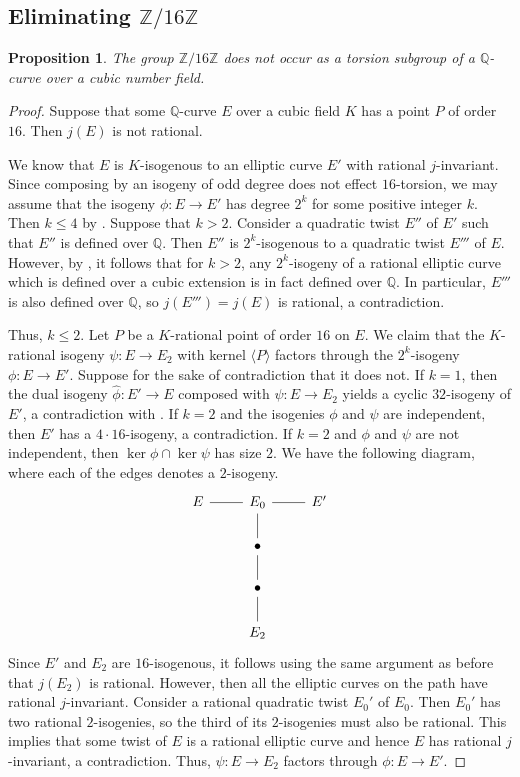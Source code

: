 \documentclass[10pt,leqno]{amsart}
\newcommand{\Z}{\mathbb{Z}}
\newcommand{\Q}{\mathbb{Q}}
\newtheorem{proposition}[theorem]{Proposition}
\theoremstyle{definition}
\theoremstyle{remark}
\numberwithin{theorem}{section}
\begin{document}
\subsection{Eliminating $\Z/16\Z$} 
\begin{proposition}\label{eliminiraj16}
    The group $\Z/16\Z$ does not occur as a torsion subgroup of a $\Q$-curve over a cubic number field.
\end{proposition}
\begin{proof}
    Suppose  that some $\Q$-curve $E$ over a cubic field $K$ has a point $P$ of order $16$. Then $j(E)$ is not rational. 
    
    We know that $E$ is $K$-isogenous to an elliptic curve $E'$ with rational $j$-invariant. Since composing by an isogeny of odd degree does not effect $16$-torsion, we may assume that the isogeny $\phi: E \to E'$ has degree $2^k$ for some positive integer $k$. Then $k\leq 4$ by \cite[Theorem 1.2]{ja}. Suppose that $k>2$. Consider a quadratic twist $E''$ of $E'$ such that $E''$ is defined over $\Q$. Then  $E''$ is $2^k$-isogenous to a quadratic twist $E'''$ of $E$. However, by \cite[Proposition 3.2]{ja}, it follows that for $k>2$, any $2^k$-isogeny of a rational elliptic curve which is defined over a cubic extension is in fact defined over $\Q$. In particular, $E'''$ is also defined over $\Q$, so $j(E''')=j(E)$ is rational, a contradiction. 
    

    Thus, $k\leq 2$. Let $P$ be a $K$-rational point of order $16$ on $E$. We claim that the $K$-rational isogeny $\psi:E \to E_2$ with kernel $\langle P \rangle$ factors through the $2^k$-isogeny $\phi: E \to E'$. Suppose for the sake of contradiction that it does not. If $k=1$, then the dual isogeny $\hat{\phi}:E' \to E$ composed with $\psi: E \to E_2$ yields a cyclic $32$-isogeny of $E'$, a contradiction with \cite[Theorem 1.2]{ja}. If $k=2$ and the isogenies $\phi$ and $ \psi$ are independent, then $E'$ has a $4\cdot 16$-isogeny, a contradiction. If $k=2$ and $\phi$ and $\psi$ are not independent, then $\ker \phi \cap \ker \psi$ has size $2$. We have the following diagram, where each of the edges denotes a $2$-isogeny.
    \[\begin{tikzcd}
	E & E_0 & {E'} \\
	& \bullet \\
	& \bullet \\
	& {E_2}
	\arrow[no head, from=1-1, to=1-2]
	\arrow[no head, from=1-2, to=1-3]
	\arrow[no head, from=1-2, to=2-2]
	\arrow[no head, from=2-2, to=3-2]
	\arrow[no head, from=3-2, to=4-2]
\end{tikzcd}\]
    Since $E'$ and $E_2$ are $16$-isogenous, it follows using the same argument as before that $j(E_2)$ is rational. However, then all the elliptic curves on the path have rational $j$-invariant. Consider a rational quadratic twist $E_0'$ of $E_0$. Then $E_0'$ has two rational $2$-isogenies, so the third of its $2$-isogenies must also be rational. This implies that some twist of $E$ is a rational elliptic curve and hence $E$ has rational $j$-invariant, a contradiction. Thus, $\psi: E \to E_2$ factors through $\phi: E \to E'$. 


\end{proof}
\end{document}

